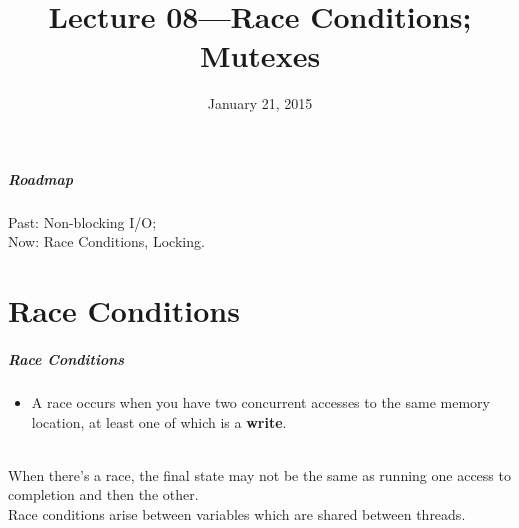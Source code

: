 \documentclass[aspectratio=43]{beamer}
\title{Lecture 08---Race Conditions; Mutexes}
\date{January 21, 2015}
\newenvironment{changemargin}[1]{%
  \begin{list}{}{%
    \setlength{\topsep}{0pt}%
    \setlength{\leftmargin}{#1}%
    \setlength{\rightmargin}{1em}
    \setlength{\listparindent}{\parindent}%
    \setlength{\itemindent}{\parindent}%
    \setlength{\parsep}{\parskip}%
  }%
  \item[]}{\end{list}}
\begin{document}
\begin{frame}[plain]
  \titlepage
\end{frame}

\begin{frame}
  \frametitle{Roadmap}

  \Large
    \begin{changemargin}{2cm}
  Past: Non-blocking I/O;\\[1em]

  Now: Race Conditions, Locking.
    \end{changemargin}
  
\end{frame}

\part{Race Conditions}
\frame{\partpage}

\begin{frame}
  \frametitle{Race Conditions}

  \begin{changemargin}{2.5cm}
  \begin{itemize}
    \item A race occurs when you have two concurrent accesses to the
      same memory location, at least one of which is a {\bf write}.
  \end{itemize}~\\

   When there's a race, the final state may not be the same as
      running one access to completion and then the other.\\[1em]
   Race conditions arise between variables which
      are shared between threads.
  \end{changemargin}

\end{frame}
\end{document}
